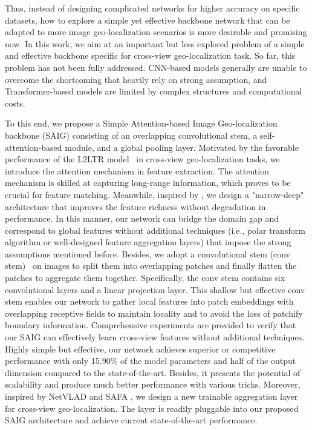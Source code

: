 \documentclass[sn-basic,iicol]{sn-jnl}
\theoremstyle{thmstyletwo}\newtheorem{example}{Example}\newtheorem{remark}{Remark}
\theoremstyle{thmstylethree}\newtheorem{definition}{Definition}
\begin{document}
Thus, instead of designing complicated networks for higher accuracy on specific datasets, how to explore a simple yet effective backbone network that can be adapted to more image geo-localization scenarios is more desirable and promising now.
In this work, we aim at an important but less explored problem of a simple and effective backbone specific for cross-view geo-localization task. So far, this problem has not been fully addressed. CNN-based models generally are unable to overcome the shortcoming that heavily rely on strong assumption, and Transformer-based models are limited by complex structures and computational costs. 

To this end, we propose a Simple Attention-based Image Geo-localization backbone (SAIG) consisting of an overlapping convolutional stem, a self-attention-based module, and a global pooling layer. Motivated by the favorable performance of the L2LTR model~\citep{L2LTR2021} in cross-view geo-localization tasks, we introduce the attention mechanism in feature extraction. The attention mechanism is skilled at capturing long-range information, which proves to be crucial for feature matching. Meanwhile, inspired by \citep{T2T-ViT2021}, we design a "narrow-deep" architecture that improves the feature richness without degradation in performance. In this manner, our network can bridge the domain gap and correspond to global features without additional techniques (i.e., polar transform algorithm or well-designed feature aggregation layers) that impose the strong assumptions mentioned before. Besides, we adopt a convolutional stem (conv stem)~\citep{earlyconv2021} on images to split them into overlapping patches and finally flatten the patches to aggregate them together. Specifically, the conv stem contains six convolutional layers and a linear projection layer. This shallow but effective conv stem enables our network to gather local features into patch embeddings with overlapping receptive fields to maintain locality and to avoid the loss of patchify boundary information. Comprehensive experiments are provided to verify that our SAIG can effectively learn cross-view features without additional techniques. Highly simple but effective, our network achieves superior or competitive performance with only 15.90\% of the model parameters and half of the output dimension compared to the state-of-the-art. Besides, it presents the potential of scalability and produce much better performance with various tricks. Moreover, inspired by NetVLAD \citep{hu2018cvm} and SAFA \citep{SAFA2019}, we design a new trainable aggregation layer for cross-view geo-localization. The layer is readily pluggable into our proposed SAIG architecture and achieve current state-of-the-art performance.
\end{document}
